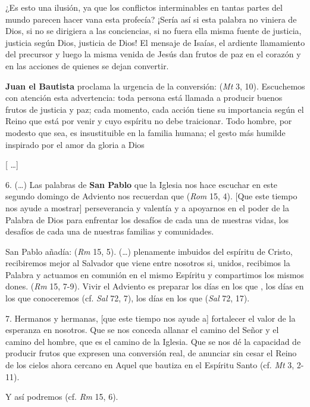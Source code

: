 \begin{body}
	¿Es esto una ilusión, ya que los conflictos interminables en tantas partes del mundo parecen hacer vana esta profecía? ¡Sería así si esta palabra no viniera de Dios, si no se dirigiera a las conciencias, si no fuera ella misma fuente de justicia, justicia según Dios, justicia de Dios! El mensaje de Isaías, el ardiente llamamiento del precursor y luego la misma venida de Jesús dan frutos de paz en el corazón y en las acciones de quienes se dejan convertir.
	
	\textbf{Juan el Bautista} proclama la urgencia de la conversión:  (\emph{Mt} 3, 10). Escuchemos con atención esta advertencia: toda persona está llamada a producir buenos frutos de justicia y paz; cada momento, cada acción tiene su importancia según el Reino que está por venir y cuyo espíritu no debe traicionar. Todo hombre, por modesto que sea, es insustituible en la familia humana; el gesto más humilde inspirado por el amor da gloria a Dios
	
	{[} \ldots{}{]}
	
	6. (\ldots{}) Las palabras de \textbf{San Pablo} que la Iglesia nos hace escuchar en este segundo domingo de Adviento nos recuerdan que  (\emph{Rom} 15, 4). {[}Que este tiempo nos ayude a mostrar{]} perseverancia y valentía y a apoyarnos en el poder de la Palabra de Dios para enfrentar los desafíos de cada una de nuestras vidas, los desafíos de cada una de nuestras familias y comunidades.
	
	San Pablo añadía:  (\emph{Rm} 15, 5). (\ldots{}) plenamente imbuidos del espíritu de Cristo, recibiremos mejor al Salvador que viene entre nosotros si, unidos, recibimos la Palabra y actuamos en comunión en el mismo Espíritu y compartimos los mismos dones.  (\emph{Rm} 15, 7-9). Vivir el Adviento es preparar los días en los que , los días en los que conoceremos  (cf. \emph{Sal} 72, 7), los días en los que  (\emph{Sal} 72, 17).
	
	7. Hermanos y hermanas, {[}que este tiempo nos ayude a{]} fortalecer el valor de la esperanza en nosotros. Que se nos conceda allanar el camino del Señor y el camino del hombre, que es el camino de la Iglesia. Que se nos dé la capacidad de producir frutos que expresen una conversión real, de anunciar sin cesar el Reino de los cielos ahora cercano en Aquel que bautiza en el Espíritu Santo (cf. \emph{Mt} 3, 2-11).
	
	Y así podremos  (cf. \emph{Rm} 15, 6).
\end{body}

